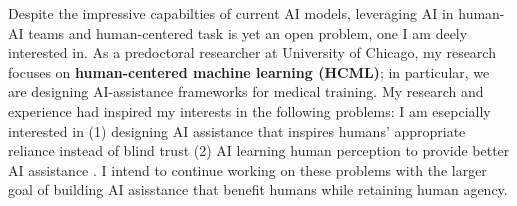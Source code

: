 




Despite the impressive capabilties of current AI models, leveraging AI in human-AI teams and human-centered task is yet an open problem, one I am deely interested in.
As a predoctoral researcher at University of Chicago, my research focuses on \textbf{human-centered machine learning (HCML)}; 
in particular, we are designing AI-assistance frameworks for medical training. 
My research and experience had inspired my interests in the following problems:
I am esepcially interested in
(1) designing AI assistance that inspires humans' appropriate reliance instead of blind trust 
(2) AI learning human perception to provide better AI assistance
.
I intend to continue working on these problems with the larger goal of building AI asisstance that benefit humans while retaining human agency.

